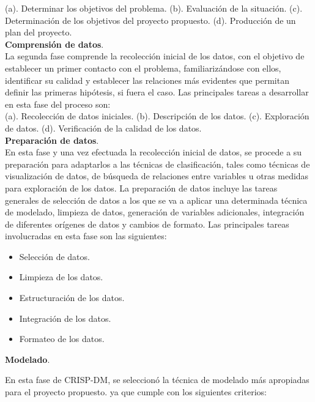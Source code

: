 (a).	Determinar los objetivos del problema.
(b).	Evaluación de la situación.
(c).	Determinación de los objetivos del proyecto propuesto.
(d).	Producción de un plan del proyecto.\\


\noindent
\textbf{Comprensión de datos}.\\

	La segunda fase comprende la recolección inicial de los  datos, con el objetivo de establecer un primer contacto con el problema, familiarizándose con ellos, identificar su calidad y establecer las relaciones más evidentes que permitan definir las primeras hipótesis, si fuera el caso. Las principales tareas a desarrollar en esta fase del proceso son:\\

(a).	Recolección de datos iniciales. 
(b).	Descripción de los datos.
(c).	Exploración de datos.
(d).	Verificación de la calidad de los datos.\\

\noindent
\textbf{Preparación de datos}.\\

En esta fase y una vez efectuada la recolección inicial de datos, se procede a su preparación para adaptarlos a las técnicas de clasificación, tales como técnicas de visualización de datos, de búsqueda de relaciones entre variables u otras medidas para exploración de los datos. La preparación de datos incluye las tareas generales de selección de datos a los que se va a aplicar una determinada técnica de modelado, limpieza de datos, generación de variables adicionales, integración de diferentes orígenes de datos y cambios de formato. Las principales tareas involucradas en esta fase son las siguientes:\\

\begin{itemize}
\item	Selección de datos.
\item Limpieza de los datos.
\item	Estructuración de los datos.
\item	Integración de los datos.
\item	Formateo de los datos.\\
\end{itemize}

\noindent
\textbf{Modelado}.

En esta fase de CRISP-DM, se seleccionó la técnica de modelado más apropiadas para el proyecto propuesto. ya que cumple con los siguientes criterios: 

